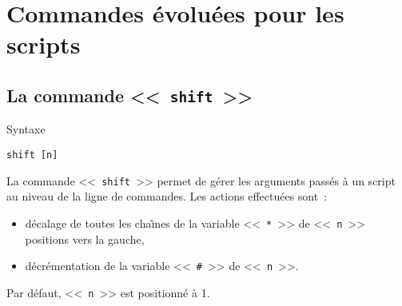 %
%

\setcounter{remarque-cnt}{1}
\setcounter{example-cnt}{1}
\chapter{Commandes {\'e}volu{\'e}es pour les scripts}
\thispagestyle{fancy}

\section{\label{advcmds-shift}La commande <<~\texttt{shift}~>>}

\begin{definition}{Syntaxe}
\begin{verbatim}
shift [n]
\end{verbatim}
\end{definition}

La commande <<~\texttt{shift}~>> permet de g{\'e}rer les arguments pass{\'e}s {\`a} un
script au niveau de la ligne de commandes. Les actions effectu{\'e}es sont~:
\begin{itemize}
	\item	d{\'e}calage de toutes les cha{\^\i}nes de la variable <<~\texttt{*}~>>
			de <<~\texttt{n}~>> positions vers la gauche,
	\item	d{\'e}cr{\'e}mentation de la variable <<~\texttt{\#}~>> de <<~\texttt{n}~>>.
\end{itemize}
Par d{\'e}faut, <<~\texttt{n}~>> est positionn{\'e} {\`a} 1.

